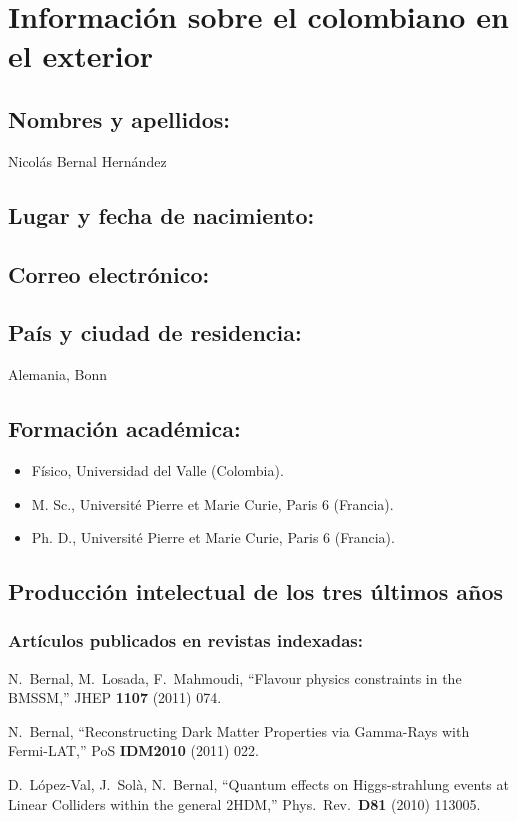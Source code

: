 \section{Información sobre el colombiano en el exterior}
\subsection{Nombres y apellidos: }
Nicolás Bernal Hernández
\subsection{Lugar y fecha de nacimiento: }
\fnbernal
\subsection{Correo electrónico: }
\embernal
\subsection{País y ciudad de residencia: }
Alemania, Bonn
\subsection{Formación académica:}
\begin{itemize}
\item Físico, Universidad del Valle (Colombia).
\item M. Sc.,  Université Pierre et Marie Curie, Paris 6 (Francia).
\item Ph. D.,  Université Pierre et Marie Curie, Paris 6 (Francia).
\end{itemize}
\subsection{Producción intelectual de los tres últimos años}
\subsubsection{Artículos publicados en revistas indexadas:}
  N.~Bernal, M.~Losada, F.~Mahmoudi,
  ``Flavour physics constraints in the BMSSM,''
  JHEP {\bf 1107 } (2011)  074.

  N.~Bernal,
  ``Reconstructing Dark Matter Properties via Gamma-Rays with Fermi-LAT,''
  PoS {\bf IDM2010 } (2011)  022.

  D.~López-Val, J.~Solà, N.~Bernal,
  ``Quantum effects on Higgs-strahlung events at Linear Colliders within the general 2HDM,''
  Phys.\ Rev.\  {\bf D81 } (2010)  113005.

